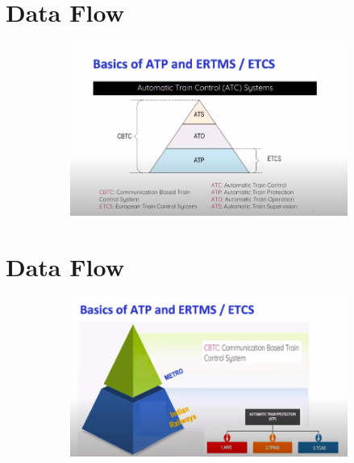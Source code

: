 \documentclass{beamer}
\begin{document}
\section{Data Flow}
\begin{frame}

\begin{figure}[h!]
  \centering
  \begin{subfigure}[b]{1\linewidth}
    \includegraphics[width=\linewidth]{./figs/KAVACH4.png}
  \end{subfigure}

\end{figure}

\end{frame}

\section{Data Flow}
\begin{frame}

\begin{figure}[h!]
  \centering
  \begin{subfigure}[b]{1\linewidth}
    \includegraphics[width=\linewidth]{./figs/KAVACH5.png}
  \end{subfigure}

\end{figure}

\end{frame}
\end{document}
